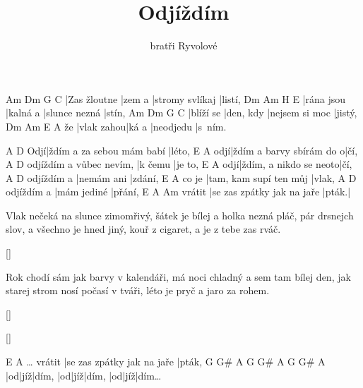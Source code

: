 \documentclass{song}
\title{Odjíždím}
\author{bratři Ryvolové}
\begin{document}
\strophe
Am           Dm     G               C
|Zas žloutne |zem a |stromy svlíkaj |listí,
Dm         Am       H\7           E
|rána jsou |kalná a |slunce nezná |stín,
Am        Dm        G              C
|blíží se |den, kdy |nejsem si moc |jistý,
   Dm         Am    E         A
že |vlak zahou|ká a |neodjedu |s~ním.
\endstrophe

    A                         D
Odjí|ždím a za sebou mám babí |léto,
    E\7                      A
odjí|ždím a barvy sbírám do o|čí,
                        A\7     D
odjíždím a vůbec nevím, |k čemu |je to,
    E\7                    A
odjí|ždím, a nikdo se neoto|čí,
           A\7        D
odjíždím a |nemám ani |zdání,
      E\7                    A
co je |tam, kam supí ten můj |vlak,
           A\7         D
odjíždím a |mám jediné |přání,
       E\7                        A     Am
vrátit |se zas zpátky jak na jaře |pták.|
\endstrophe

\strophe*
Vlak nečeká na slunce zimomřivý,
šátek je bílej a holka nezná pláč,
pár drsnejch slov, a všechno je hned jiný,
kouř z cigaret, a je z tebe zas rváč.
\endstrophe

\ref{}

\strophe*
Rok chodí sám jak barvy v kalendáři,
má noci chladný a sem tam bílej den,
jak starej strom nosí počasí v tváři,
léto je pryč a jaro za rohem.
\endstrophe

\ref{}

\ref{}

\strophe
                E\7                        A
\ldots{} vrátit |se zas zpátky jak na jaře |pták,
G  G\# A     G  G\# A     G  G\# A
|od|jíž|dím, |od|jíž|dím, |od|jíž|dím\ldots
\endstrophe
\end{document}
